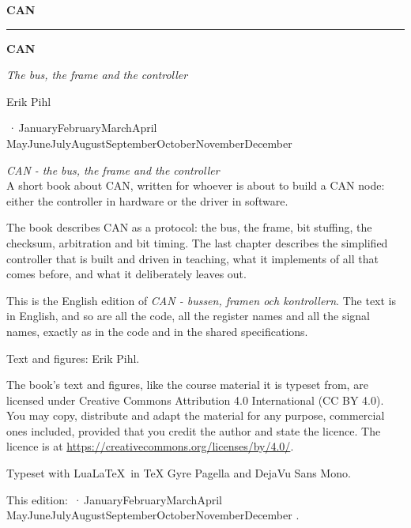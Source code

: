 \providecommand{\bookversion}{}
\newcommand{\bookdate}{\number\day\space\ifcase\month\or January\or February\or March\or April\or
  May\or June\or July\or August\or September\or October\or November\or December\fi\space
  \number\year}
\newcommand{\bookedition}{\ifx\bookversion\empty\else\bookversion\,·\,\fi\bookdate}

\thispagestyle{empty}
\vspace*{2.2in}
\begin{flushright}
  {\Large\bfseries CAN}
\end{flushright}
\cleardoublepage

\thispagestyle{empty}
\vspace*{1.1in}
\begin{flushleft}
  {\color{accent}\rule{0.9in}{2.5pt}}\par\vspace{1.4ex}
  {\fontsize{32}{38}\selectfont\bfseries CAN\par}
  \vspace{2.2ex}
  {\Large\itshape The bus, the frame and the controller\par}
  \vspace{1.2in}
  {\large Erik Pihl\par}
  \vfill
  \vspace{0.6ex}
  {\small\color{muted} \bookedition\par}
\end{flushleft}
\newpage

\thispagestyle{empty}
\vspace*{\fill}
{\small
\noindent\textit{CAN - the bus, the frame and the controller}\\
A short book about CAN, written for whoever is about to build a CAN node: either the controller
in hardware or the driver in software.

\medskip
\noindent The book describes CAN as a protocol: the bus, the frame, bit stuffing, the checksum,
arbitration and bit timing. The last chapter describes the simplified controller that is built and
driven in teaching, what it implements of all that comes before, and what it deliberately leaves
out.

\medskip
\noindent This is the English edition of
\foreignlanguage{swedish}{\textit{CAN - bussen, framen och kontrollern}}. The text is in English,
and so are all the code, all the register names and all the signal names, exactly as in the code
and in the shared specifications.

\medskip
\noindent Text and figures: Erik Pihl.

\medskip
\noindent The book's text and figures, like the course material it is typeset from, are licensed
under Creative Commons Attribution 4.0 International (CC BY 4.0). You may copy, distribute and
adapt the material for any purpose, commercial ones included, provided that you credit the author
and state the licence. The licence is at \url{https://creativecommons.org/licenses/by/4.0/}.

\medskip
\noindent Typeset with Lua\LaTeX\ in TeX Gyre Pagella and DejaVu Sans Mono.

\medskip
\noindent\textcolor{muted}{This edition: \bookedition.}
\par}
\cleardoublepage
